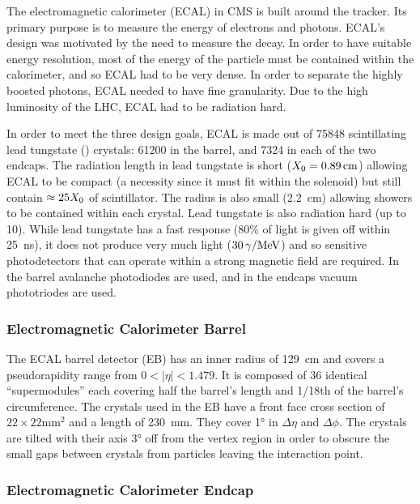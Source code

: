 The electromagnetic calorimeter (ECAL) in CMS is built around the tracker. Its
primary purpose is to measure the energy of electrons and photons. ECAL's
design was motivated by the need to measure the \higgstogammagamma decay. In
order to have suitable energy resolution, most of the energy of the particle
must be contained within the calorimeter, and so ECAL had to be very dense. In
order to separate the highly boosted photons, ECAL needed to have fine
granularity. Due to the high luminosity of the LHC, ECAL had to be radiation
hard.

In order to meet the three design goals, ECAL is made out of \num{75848}
scintillating lead tungstate (\leadtungstate) crystals: \num{61200} in the
barrel, and \num{7324} in each of the two endcaps. The radiation length in lead
tungstate is short ($X_{0} = \SI{0.89}{\centi\meter}$) allowing ECAL
to be compact (a necessity since it must fit within the solenoid) but still
contain $\approx 25X_{0}$ of scintillator. The \Moliere radius is
also small (\SI{2.2}{\centi\meter}) allowing showers to be contained within
each crystal. Lead tungstate is also radiation hard (up to 10\megarads). While
lead tungstate has a fast response (80\% of light is given off within
\SI{25}{\nano\second}), it does not produce very much light
($\SI{30}{\photon\per\MeV}$) and so sensitive photodetectors that can operate
within a strong magnetic field are required. In the barrel avalanche
photodiodes are used, and in the endcaps vacuum phototriodes are used.

\subsubsection{Electromagnetic Calorimeter Barrel}

The ECAL barrel detector (EB) has an inner radius of \SI{129}{\centi\meter} and
covers a pseudorapidity range from $0 < |\eta| < 1.479$. It is composed of 36
identical ``supermodules'' each covering half the barrel's length and 1/18th of
the barrel's circumference. The crystals used in the EB have a front face cross
section of $22 \times 22 \si{\milli\meter\squared}$ and a length of
\SI{230}{\milli\meter}. They cover \ang{1} in $\Delta \eta$ and $\Delta \phi$.
The crystals are tilted with their axis \ang{3} off from the vertex region in
order to obscure the small gaps between crystals from particles leaving the
interaction point.

\subsubsection{Electromagnetic Calorimeter Endcap}

